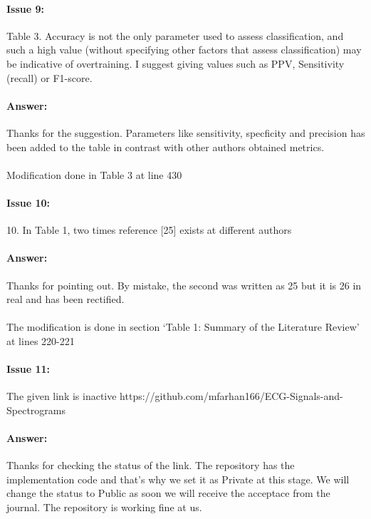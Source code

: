 \documentclass{article}
\begin{document}
\paragraph{Issue 9:}
\begin{displayquote}
Table 3. Accuracy is not the only parameter used to assess classification, and such a high value (without specifying other factors that assess classification) may be indicative of overtraining. I suggest giving values such as PPV, Sensitivity (recall) or F1-score.
\end{displayquote}

\paragraph{Answer:}
Thanks for the suggestion. Parameters like sensitivity, specficity and precision has been added to the table in contrast with other authors obtained metrics. \\\\

Modification done in Table 3 at line 430

\paragraph{Issue 10:}
\begin{displayquote}
10. In Table 1, two times reference [25] exists at different authors
\end{displayquote}

\paragraph{Answer:}
Thanks for pointing out. By mistake, the second was written as 25 but it is 26 in real and has been rectified.\\\\

The modification is done in section `Table 1: Summary of the Literature Review' at lines 220-221
\paragraph{Issue 11:}
\begin{displayquote}
The given link is inactive https://github.com/mfarhan166/ECG-Signals-and-Spectrograms
\end{displayquote}

\paragraph{Answer:}
Thanks for checking the status of the link. The repository has the implementation code and that's why we set it as Private at this stage. We will change the status to Public as soon we will receive the acceptace from the journal. The repository is working fine at us. 
\end{document}

